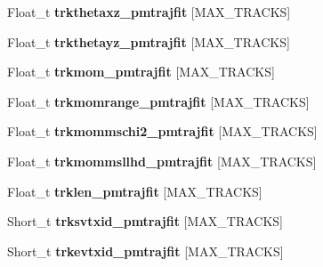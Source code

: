\begin{DoxyCompactItemize}
\item 
\hypertarget{classanatree_ad53fc5e3baf134af1a6c5ff0e77319c1}{Float\-\_\-t {\bfseries trkthetaxz\-\_\-pmtrajfit} \mbox{[}M\-A\-X\-\_\-\-T\-R\-A\-C\-K\-S\mbox{]}}\label{classanatree_ad53fc5e3baf134af1a6c5ff0e77319c1}

\item 
\hypertarget{classanatree_a3cb86d98b107817c512e85bca2ad32cc}{Float\-\_\-t {\bfseries trkthetayz\-\_\-pmtrajfit} \mbox{[}M\-A\-X\-\_\-\-T\-R\-A\-C\-K\-S\mbox{]}}\label{classanatree_a3cb86d98b107817c512e85bca2ad32cc}

\item 
\hypertarget{classanatree_a74fe2d3cfc1dad1efb636467ebb0d90d}{Float\-\_\-t {\bfseries trkmom\-\_\-pmtrajfit} \mbox{[}M\-A\-X\-\_\-\-T\-R\-A\-C\-K\-S\mbox{]}}\label{classanatree_a74fe2d3cfc1dad1efb636467ebb0d90d}

\item 
\hypertarget{classanatree_a2aeeeb27bbd68acf0a4c3d3f4b2ab82c}{Float\-\_\-t {\bfseries trkmomrange\-\_\-pmtrajfit} \mbox{[}M\-A\-X\-\_\-\-T\-R\-A\-C\-K\-S\mbox{]}}\label{classanatree_a2aeeeb27bbd68acf0a4c3d3f4b2ab82c}

\item 
\hypertarget{classanatree_af4bf7af4809c404814a1d84175d95339}{Float\-\_\-t {\bfseries trkmommschi2\-\_\-pmtrajfit} \mbox{[}M\-A\-X\-\_\-\-T\-R\-A\-C\-K\-S\mbox{]}}\label{classanatree_af4bf7af4809c404814a1d84175d95339}

\item 
\hypertarget{classanatree_ac0d1d2fc3fe6e48e81257c327f8f94bc}{Float\-\_\-t {\bfseries trkmommsllhd\-\_\-pmtrajfit} \mbox{[}M\-A\-X\-\_\-\-T\-R\-A\-C\-K\-S\mbox{]}}\label{classanatree_ac0d1d2fc3fe6e48e81257c327f8f94bc}

\item 
\hypertarget{classanatree_ac99185ab75915de0b9003619a3fd7864}{Float\-\_\-t {\bfseries trklen\-\_\-pmtrajfit} \mbox{[}M\-A\-X\-\_\-\-T\-R\-A\-C\-K\-S\mbox{]}}\label{classanatree_ac99185ab75915de0b9003619a3fd7864}

\item 
\hypertarget{classanatree_aeab61a1f293160bd323af37b3effe604}{Short\-\_\-t {\bfseries trksvtxid\-\_\-pmtrajfit} \mbox{[}M\-A\-X\-\_\-\-T\-R\-A\-C\-K\-S\mbox{]}}\label{classanatree_aeab61a1f293160bd323af37b3effe604}

\item 
\hypertarget{classanatree_a8812d0537b469650baebff4fbd339d46}{Short\-\_\-t {\bfseries trkevtxid\-\_\-pmtrajfit} \mbox{[}M\-A\-X\-\_\-\-T\-R\-A\-C\-K\-S\mbox{]}}\label{classanatree_a8812d0537b469650baebff4fbd339d46}


\end{DoxyCompactItemize}
